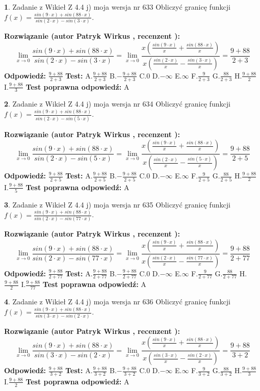 \documentclass[12pt, a4paper]{article}
\theoremstyle{definition} %
\newtheorem{zad}{}
\newcommand{\zadStart}[1]{\begin{zad}#1\newline}
\newcommand{\zadStop}{\end{zad}}
\newcommand{\rozwStart}[2]{\noindent \textbf{Rozwiązanie (autor #1 , recenzent #2): }\newline}
\newcommand{\rozwStop}{\newline}
\newcommand{\odpStart}{\noindent \textbf{Odpowiedź:}\newline}
\newcommand{\odpStop}{\newline}
\newcommand{\testStart}{\noindent \textbf{Test:}\newline}
\newcommand{\testStop}{\newline}
\newcommand{\kluczStart}{\noindent \textbf{Test poprawna odpowiedź:}\newline}
\newcommand{\kluczStop}{\newline}
\begin{document}
\zadStart{Zadanie z Wikieł Z 4.4 j) moja wersja nr 633}
Obliczyć granicę funkcji $f(x)=\frac{sin(9\cdot x) +sin(88\cdot x)}{sin(2\cdot x) -sin(3\cdot x)}$.
\zadStop
\rozwStart{Patryk Wirkus}{}
$$\lim\limits_{x\to 0}\frac{sin(9\cdot x) +sin(88\cdot x)}{sin(2\cdot x) -sin(3\cdot x)}=\lim\limits_{x\to 0}\frac{x(\frac{sin(9\cdot x)}{x}+\frac{sin(88\cdot x)}{x})}{x(\frac{sin(2\cdot x)}{x}-\frac{sin(3\cdot x)}{x})}=\frac{9+88}{2+3}$$
\rozwStop
\odpStart
$\frac{9+88}{2+3}$
\odpStop
\testStart
A.$\frac{9+88}{2+3}$
B.$-\frac{9+88}{2+3}$
C.$0$
D.$-\infty$
E.$\infty$
F.$\frac{9}{2+3}$
G.$\frac{88}{2+3}$
H.$\frac{9+88}{2}$
I.$\frac{9+88}{3}$
\testStop
\kluczStart
A
\kluczStop



\zadStart{Zadanie z Wikieł Z 4.4 j) moja wersja nr 634}
Obliczyć granicę funkcji $f(x)=\frac{sin(9\cdot x) +sin(88\cdot x)}{sin(2\cdot x) -sin(5\cdot x)}$.
\zadStop
\rozwStart{Patryk Wirkus}{}
$$\lim\limits_{x\to 0}\frac{sin(9\cdot x) +sin(88\cdot x)}{sin(2\cdot x) -sin(5\cdot x)}=\lim\limits_{x\to 0}\frac{x(\frac{sin(9\cdot x)}{x}+\frac{sin(88\cdot x)}{x})}{x(\frac{sin(2\cdot x)}{x}-\frac{sin(5\cdot x)}{x})}=\frac{9+88}{2+5}$$
\rozwStop
\odpStart
$\frac{9+88}{2+5}$
\odpStop
\testStart
A.$\frac{9+88}{2+5}$
B.$-\frac{9+88}{2+5}$
C.$0$
D.$-\infty$
E.$\infty$
F.$\frac{9}{2+5}$
G.$\frac{88}{2+5}$
H.$\frac{9+88}{2}$
I.$\frac{9+88}{5}$
\testStop
\kluczStart
A
\kluczStop



\zadStart{Zadanie z Wikieł Z 4.4 j) moja wersja nr 635}
Obliczyć granicę funkcji $f(x)=\frac{sin(9\cdot x) +sin(88\cdot x)}{sin(2\cdot x) -sin(77\cdot x)}$.
\zadStop
\rozwStart{Patryk Wirkus}{}
$$\lim\limits_{x\to 0}\frac{sin(9\cdot x) +sin(88\cdot x)}{sin(2\cdot x) -sin(77\cdot x)}=\lim\limits_{x\to 0}\frac{x(\frac{sin(9\cdot x)}{x}+\frac{sin(88\cdot x)}{x})}{x(\frac{sin(2\cdot x)}{x}-\frac{sin(77\cdot x)}{x})}=\frac{9+88}{2+77}$$
\rozwStop
\odpStart
$\frac{9+88}{2+77}$
\odpStop
\testStart
A.$\frac{9+88}{2+77}$
B.$-\frac{9+88}{2+77}$
C.$0$
D.$-\infty$
E.$\infty$
F.$\frac{9}{2+77}$
G.$\frac{88}{2+77}$
H.$\frac{9+88}{2}$
I.$\frac{9+88}{77}$
\testStop
\kluczStart
A
\kluczStop



\zadStart{Zadanie z Wikieł Z 4.4 j) moja wersja nr 636}
Obliczyć granicę funkcji $f(x)=\frac{sin(9\cdot x) +sin(88\cdot x)}{sin(3\cdot x) -sin(2\cdot x)}$.
\zadStop
\rozwStart{Patryk Wirkus}{}
$$\lim\limits_{x\to 0}\frac{sin(9\cdot x) +sin(88\cdot x)}{sin(3\cdot x) -sin(2\cdot x)}=\lim\limits_{x\to 0}\frac{x(\frac{sin(9\cdot x)}{x}+\frac{sin(88\cdot x)}{x})}{x(\frac{sin(3\cdot x)}{x}-\frac{sin(2\cdot x)}{x})}=\frac{9+88}{3+2}$$
\rozwStop
\odpStart
$\frac{9+88}{3+2}$
\odpStop
\testStart
A.$\frac{9+88}{3+2}$
B.$-\frac{9+88}{3+2}$
C.$0$
D.$-\infty$
E.$\infty$
F.$\frac{9}{3+2}$
G.$\frac{88}{3+2}$
H.$\frac{9+88}{3}$
I.$\frac{9+88}{2}$
\testStop
\kluczStart
A
\kluczStop
\end{document}
